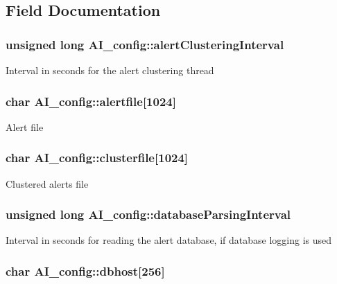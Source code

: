 \subsection{Field Documentation}
\hypertarget{structAI__config_a7d0d098b8263aa3d8415b11d1ec7f93d}{
\subsubsection[{alertClusteringInterval}]{\setlength{\rightskip}{0pt plus 5cm}unsigned long {\bf AI\_\-config::alertClusteringInterval}}}
\label{structAI__config_a7d0d098b8263aa3d8415b11d1ec7f93d}
Interval in seconds for the alert clustering thread \hypertarget{structAI__config_a2efa9590d7eea6dce8b5dd9aa76ed8ca}{
\subsubsection[{alertfile}]{\setlength{\rightskip}{0pt plus 5cm}char {\bf AI\_\-config::alertfile}\mbox{[}1024\mbox{]}}}
\label{structAI__config_a2efa9590d7eea6dce8b5dd9aa76ed8ca}
Alert file \hypertarget{structAI__config_a6da02a3f7116fd3810a41b738e8883a3}{
\subsubsection[{clusterfile}]{\setlength{\rightskip}{0pt plus 5cm}char {\bf AI\_\-config::clusterfile}\mbox{[}1024\mbox{]}}}
\label{structAI__config_a6da02a3f7116fd3810a41b738e8883a3}
Clustered alerts file \hypertarget{structAI__config_ae6ca715cab1d90b70c3aad443133c263}{
\subsubsection[{databaseParsingInterval}]{\setlength{\rightskip}{0pt plus 5cm}unsigned long {\bf AI\_\-config::databaseParsingInterval}}}
\label{structAI__config_ae6ca715cab1d90b70c3aad443133c263}
Interval in seconds for reading the alert database, if database logging is used \hypertarget{structAI__config_a8e56f1a1b2095d3d329c8068ea0f3aab}{
\subsubsection[{dbhost}]{\setlength{\rightskip}{0pt plus 5cm}char {\bf AI\_\-config::dbhost}\mbox{[}256\mbox{]}}}
